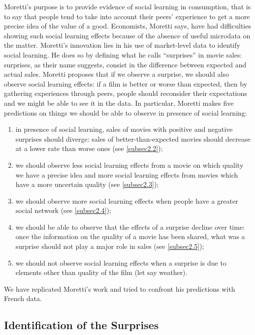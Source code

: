 Moretti's purpose is to provide evidence of social learning in consumption, that is to say that people tend to take into account their peers' experience to get a more precise idea of the value of a good. Economists, Moretti says, have had difficulties showing such social learning effects because of the absence of useful microdata on the matter. Moretti's innovation lies in his use of market-level data to identify social learning. He does so by defining what he calls ``surprises'' in movie sales: surprises, as their name suggests, consist in the difference between expected and actual sales. Moretti proposes that if we observe a surprise, we should also observe social learning effects: if a film is better or worse than expected, then by gathering experiences through peers, people should reconsider their expectations and we might be able to see it in the data. In particular, Moretti makes five predictions on things we should be able to observe in presence of social learning: \begin{enumerate}
	\item in presence of social learning, sales of movies with positive and negative surprises should diverge: sales of better-than-expected movies should decrease at a lower rate than worse ones (see \ref{subsec2.2}); 
	\item we should observe less social learning effects from a movie on which quality we have a precise idea and more social learning effects from movies which have a more uncertain quality (see \ref{subsec2.3});
	\item we should observe more social learning effects when people have a greater social network (see \ref{subsec2.4});
	\item we should be able to observe that the effects of a surprise decline over time: once the information on the quality of a movie has been shared, what was a surprise should not play a major role in sales (see \ref{subsec2.5});
	\item we should not observe social learning effects when a surprise is due to elements other than quality of the film (let say weather).
\end{enumerate}
We have replicated Moretti's work and tried to confront his predictions with French data.
\subsection{Identification of the Surprises}\label{subsec2.1}

